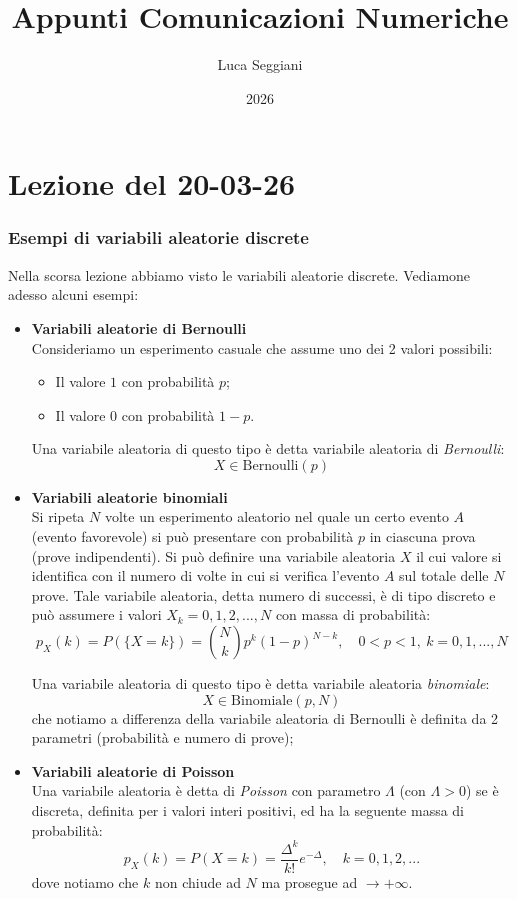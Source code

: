 \documentclass[a4paper,11pt]{article}
\title{Appunti Comunicazioni Numeriche}
\author{Luca Seggiani}
\date{2026}
\begin{document}
\section{Lezione del 20-03-26}

\thispagestyle{empty}
\pagestyle{fancy}

\subsubsection{Esempi di variabili aleatorie discrete}
Nella scorsa lezione abbiamo visto le variabili aleatorie discrete. Vediamone adesso alcuni esempi:
\begin{itemize}
\item \textbf{\textsf{Variabili aleatorie di Bernoulli}} \\
Consideriamo un esperimento casuale che assume uno dei 2 valori possibili:
\begin{itemize}
	\item Il valore $1$ con probabilità $p$;
	\item Il valore $0$ con probabilità $1 - p$.
\end{itemize}
Una variabile aleatoria di questo tipo è detta variabile aleatoria di \textit{Bernoulli}:
$$
X \in \mathrm{Bernoulli}(p)
$$

\item \textbf{\textsf{Variabili aleatorie binomiali}} \\
Si ripeta $N$ volte un esperimento aleatorio nel quale un certo evento $A$ (evento favorevole) si può presentare con probabilità $p$ in ciascuna prova (prove indipendenti). Si può definire una variabile aleatoria $X$ il cui valore si identifica con il numero di volte in cui si verifica l’evento $A$ sul totale delle $N$ prove. Tale variabile aleatoria, detta numero di successi, è di tipo discreto e può assumere i valori $X_k = 0, 1, 2, ..., N$ con massa di probabilità:
$$
p_X(k) = P(\{ X = k \}) = \binom{N}{k} p^k (1 - p)^{N - k}, \quad 0 < p < 1, \ k = 0, 1, ..., N
$$

Una variabile aleatoria di questo tipo è detta variabile aleatoria \textit{binomiale}:
$$
X \in \mathrm{Binomiale}(p, N)
$$
che notiamo a differenza della variabile aleatoria di Bernoulli è definita da 2 parametri (probabilità e numero di prove);

\item \textbf{\textsf{Variabili aleatorie di Poisson}} \\
	Una variabile aleatoria è detta di \textit{Poisson} con parametro $\Lambda$ (con $\Lambda > 0$) se è discreta, definita per i valori interi positivi, ed ha la seguente massa di probabilità:
$$
p_X(k) = P({X = k}) = \frac{\Delta^k}{k!}e ^{-\Delta}, \quad k = 0, 1, 2, ...
$$
dove notiamo che $k$ non chiude ad $N$ ma prosegue ad $\rightarrow +\infty$.


\end{itemize}
\end{document}
